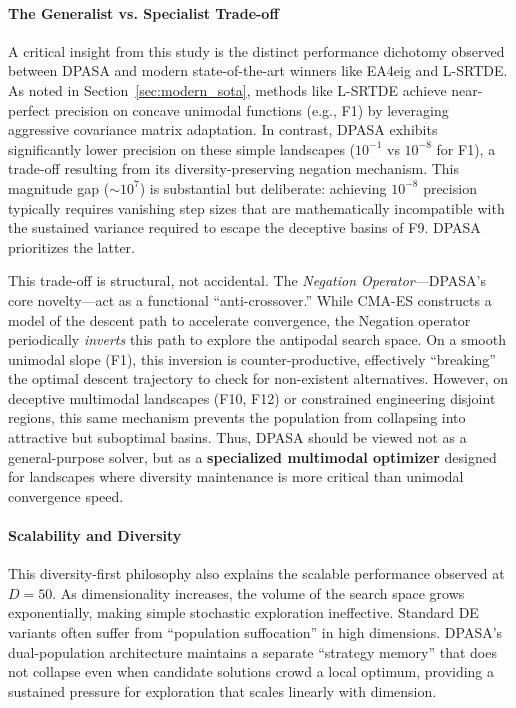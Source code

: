 \documentclass[11pt]{article}
\begin{document}
\paragraph{The Generalist vs. Specialist Trade-off} A critical insight from this study is the distinct performance dichotomy observed between DPASA and modern state-of-the-art winners like EA4eig and L-SRTDE. As noted in Section~\ref{sec:modern_sota}, methods like L-SRTDE achieve near-perfect precision on concave unimodal functions (e.g., F1) by leveraging aggressive covariance matrix adaptation. In contrast, DPASA exhibits significantly lower precision on these simple landscapes ($10^{-1}$ vs $10^{-8}$ for F1), a trade-off resulting from its diversity-preserving negation mechanism. This magnitude gap (${\sim}10^7$) is substantial but deliberate: achieving $10^{-8}$ precision typically requires vanishing step sizes that are mathematically incompatible with the sustained variance required to escape the deceptive basins of F9. DPASA prioritizes the latter.

This trade-off is structural, not accidental. The \textit{Negation Operator}---DPASA's core novelty---act as a functional ``anti-crossover.'' While CMA-ES constructs a model of the descent path to accelerate convergence, the Negation operator periodically \textit{inverts} this path to explore the antipodal search space. On a smooth unimodal slope (F1), this inversion is counter-productive, effectively ``breaking'' the optimal descent trajectory to check for non-existent alternatives. However, on deceptive multimodal landscapes (F10, F12) or constrained engineering disjoint regions, this same mechanism prevents the population from collapsing into attractive but suboptimal basins. Thus, DPASA should be viewed not as a general-purpose solver, but as a \textbf{specialized multimodal optimizer} designed for landscapes where diversity maintenance is more critical than unimodal convergence speed.

\paragraph{Scalability and Diversity} This diversity-first philosophy also explains the scalable performance observed at $D=50$. As dimensionality increases, the volume of the search space grows exponentially, making simple stochastic exploration ineffective. Standard DE variants often suffer from ``population suffocation'' in high dimensions. DPASA's dual-population architecture maintains a separate ``strategy memory'' that does not collapse even when candidate solutions crowd a local optimum, providing a sustained pressure for exploration that scales linearly with dimension.
\end{document}

